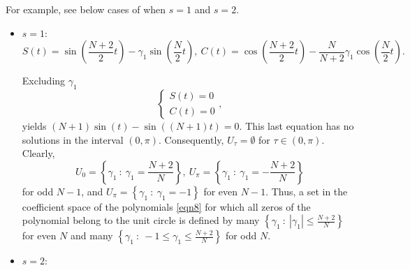 \documentclass[12pt]{article}
\newcommand{\abs}[1]{\left|#1\right|}
\newcommand{\pa}[1]{\left(#1\right)}
\newcommand{\cb}[1]{\left\{#1\right\}}
\begin{document}
For example, see below cases of when $s = 1$ and $s = 2$.
\begin{itemize}
\item $s = 1$\cite{ref1}:
\begin{displaymath}
S(t) = \sin\pa{\frac{N + 2}{2}t} - \gamma_1\sin\pa{\frac{N}{2}t}, \ C(t) = \cos\pa{\frac{N + 2}{2}t} - \frac{N}{N + 2}\gamma_1\cos\pa{\frac{N}{2}t}.
\end{displaymath}

Excluding $\gamma_1$ 
\begin{displaymath}
\begin{cases}
S(t) = 0 \\
C(t) = 0
\end{cases},
\end{displaymath}
yields $(N + 1)\sin(t) - \sin\pa{(N + 1)t} = 0$. This last equation has no solutions in the interval $\pa{0,\pi}$. Consequently, $U_\tau = \emptyset$ for $\tau \in \pa{0,\pi}$. Clearly, 
\begin{displaymath}
U_0 = \cb{\gamma_1 \ : \ \gamma_1 = \frac{N + 2}{N}}, \ U_{\pi} = \cb{\gamma_1 \ : \ \gamma_1 = -\frac{N + 2}{N}}
\end{displaymath}
for odd $N - 1$, and $\displaystyle U_{\pi} = \cb{\gamma_1 \ : \ \gamma_1 = -1}$ for even $N - 1$. Thus, a set in the coefficient space of the polynomials \eqref{eqn8} for which all zeros of the polynomial belong to the unit circle is defined by many $\displaystyle \cb{\gamma_1 \ : \ \abs{\gamma_1} \leq \frac{N + 2}{N}}$ for even $N$ and many $\displaystyle \cb{\gamma_1 \ : \ -1 \leq \gamma_1 \leq \frac{N + 2}{N}}$ for odd $N$.

\item $s = 2$:


\end{itemize}
\end{document}
